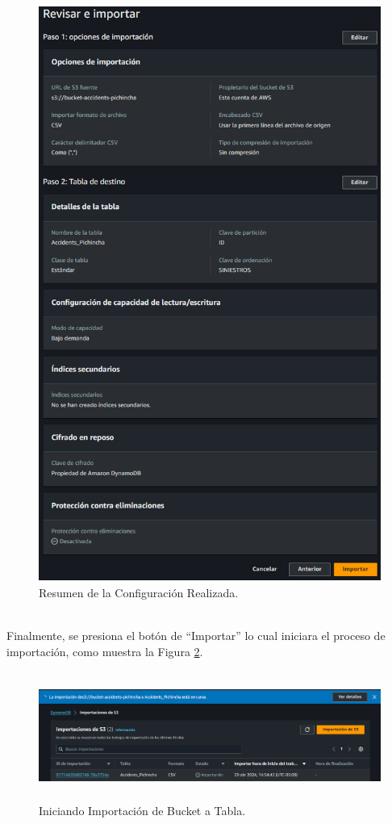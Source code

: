 \documentclass[a4paper,10pt, oneside, titlepage]{article}
\begin{document}
	\begin{figure}[!h]
		\centering
		\includegraphics[width = 1\linewidth, height = 18.9cm]{Resumen_Detalle_Configuracion_Bucket.png}
		\caption{Resumen de la Configuración Realizada.}
		\label{Resumen_Detalle_Configuracion_Bucket}
	\end{figure} \\
	\indent Finalmente, se presiona el botón de ``Importar'' lo cual iniciara el proceso de importación, como muestra la Figura \ref{Iniciando_Importacion_Bucket_Tabla}.
	\begin{figure}[!h]
		\centering
		\includegraphics[width = 1\linewidth, height = 4.2cm]{Iniciando_Importacion_Bucket_Tabla.png}
		\caption{Iniciando Importación de Bucket a Tabla.}
		\label{Iniciando_Importacion_Bucket_Tabla}
	\end{figure} \\
\end{document}

